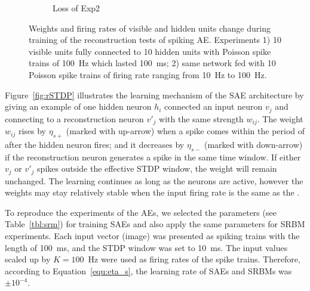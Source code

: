 \begin{figure}
\begin{subfigure}[t]{0.45\textwidth}
		\caption{Loss of Exp2}
	\end{subfigure}
	\caption{Weights and firing rates of visible and hidden units change during training of the reconstruction tests of spiking AE. 
		Experiments 1) 10 visible units fully connected to 10 hidden units with Poisson spike trains of 100~Hz which lasted 100~ms; 2) \DIFaddbeginFL {}\DIFaddendFL same network fed with 10 Poisson spike trains of firing rate ranging from 10~Hz to 100~Hz.}
	\label{fig:SAE_orig}
\end{figure}

Figure~\ref{fig:rSTDP} illustrates the learning mechanism of the SAE architecture by giving an example of one hidden neuron $h_i$ connected \DIFdelbegin {}\DIFdelend \DIFaddbegin {}\DIFaddend an input neuron $v_j$ and connecting to a reconstruction neuron $v'_j$ with the same strength $w_{ij}$.
The weight $w_{ij}$ rises by $\eta_{s+}$ (marked with \DIFaddbegin {}\DIFaddend up-arrow) when a spike comes within the period of \DIFdelbegin {}\DIFdelend \DIFaddbegin {}\DIFaddend after the hidden neuron fires;
and it decreases by $\eta_{s-}$ (marked with \DIFaddbegin {}\DIFaddend down-arrow) if the reconstruction neuron generates a spike in the same time window.
If either $v_j$ or $v'_j$ spikes outside the effective STDP window, the weight will remain unchanged.
The learning continues as long as the neurons are active, however the weights may stay relatively stable when the input firing rate is the same as the \DIFdelbegin {}\DIFdelend \DIFaddbegin {}\DIFaddend .

To reproduce the experiments of the AEs, we selected the parameters (see Table~\ref{tbl:srm}) for training SAEs and also apply the same parameters for SRBM experiments.
Each input vector (image) was presented as spiking trains with the length of 100~ms, and the STDP window was set to 10~ms.
The input values scaled up by $K=100$~Hz were used as firing rates of the spike trains.
Therefore, according to Equation~\ref{equ:eta_s}, the learning rate of SAEs and SRBMs was $\pm 10^{-4}$.

